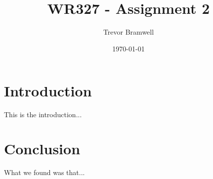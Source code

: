 \documentclass[12pt,letterpaper]{article}
\title{WR327 - Assignment 2}
\author{
    Trevor Bramwell \\
}
\date{\today}
\begin{document}

\section*{Introduction}
This is the introduction...

\pagebreak

\section*{Conclusion}
What we found was that...
\end{document}
